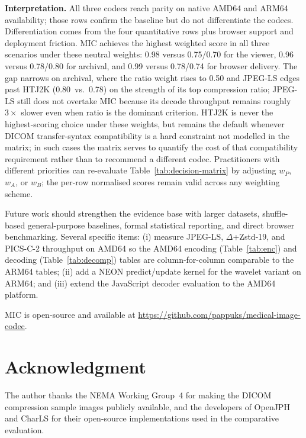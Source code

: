 \documentclass[journal]{IEEEtran}
\begin{document}
\textbf{Interpretation.}
All three codecs reach parity on native AMD64 and ARM64 availability;
those rows confirm the baseline but do not differentiate the codecs.
Differentiation comes from the four quantitative rows plus browser
support and deployment friction. MIC achieves the highest weighted
score in all three scenarios under these neutral weights: 0.98 versus
0.75/0.70 for the viewer, 0.96 versus 0.78/0.80 for archival, and 0.99
versus 0.78/0.74 for browser delivery. The gap narrows on archival,
where the ratio weight rises to 0.50 and JPEG-LS edges past HTJ2K
(0.80~vs.\ 0.78) on the strength of its top compression ratio; JPEG-LS
still does not overtake MIC because its decode throughput remains
roughly $3\times$ slower even when ratio is the dominant criterion.
HTJ2K is never the highest-scoring choice under these weights, but
remains the default whenever DICOM transfer-syntax compatibility is a
hard constraint not modelled in the matrix; in such cases the matrix
serves to quantify the cost of that compatibility requirement rather
than to recommend a different codec. Practitioners with different
priorities can re-evaluate Table~\ref{tab:decision-matrix} by adjusting
$w_P$, $w_A$, or $w_B$; the per-row normalised scores remain valid
across any weighting scheme.

Future work should strengthen the evidence base with larger datasets,
shuffle-based general-purpose baselines, formal statistical reporting, and
direct browser benchmarking. Several specific items: (i) measure JPEG-LS,
$\Delta$+Zstd-19, and PICS-C-2 throughput on AMD64 so the AMD64 encoding
(Table~\ref{tab:enc}) and decoding (Table~\ref{tab:decomp})
tables are column-for-column comparable to the ARM64 tables; (ii) add a
NEON predict/update kernel for the wavelet variant on ARM64; and (iii)
extend the JavaScript decoder evaluation to the AMD64 platform.

MIC is open-source and available at
\url{https://github.com/pappuks/medical-image-codec}.

\section*{Acknowledgment}

The author thanks the NEMA Working Group~4 for making the DICOM compression
sample images publicly available, and the developers of OpenJPH and CharLS for
their open-source implementations used in the comparative evaluation.
\end{document}
